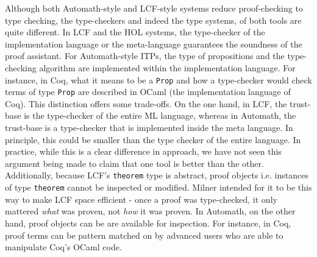 \documentclass{article}
\begin{document}
  	Although both Automath-style and 
  	LCF-style systems reduce proof-checking
  	to type checking, the type-checkers 
  	and indeed the type systems, 
  	of both tools are quite different.
  	In LCF and the HOL systems, the 
  	type-checker of the implementation 
  	language or the meta-language 
  	guarantees the soundness of the
  	proof assistant. For Automath-style
  	ITPs, the type of propositions and the 
  	type-checking algorithm are 
  	implemented within the 
  	implementation language. For 
  	instance, in Coq, what it means to 
  	be a \texttt{Prop} and how a 
  	type-checker would check 
  	terms of type \texttt{Prop} are 
  	described in OCaml (the 
  	implementation language of Coq). 
  	This distinction
  	offers some trade-offs. On the one 
  	hand, in LCF, the trust-base is 
  	the type-checker of the entire
  	ML language, whereas in Automath, 
  	the trust-base is a type-checker
  	that is implemented inside the 
  	meta language. In principle, this 
  	could be smaller than the type
  	checker of the entire language.
  	In practice, while this is a 
  	clear difference in approach,
  	we have not seen this argument 
  	being made to claim that one tool 
  	is better than the other. 
  	Additionally, because LCF's 
  	\texttt{theorem} type is abstract, 
  	proof objects i.e. instances of type
  	\texttt{theorem} cannot be 
  	inspected or modified. Milner
  	intended for it to be this way
  	to make LCF space efficient - 
  	once a proof was type-checked, 
  	it only mattered \textit{what}
  	was proven, not \textit{how} it 
  	was proven. In Automath, on the 
  	other hand, proof objects can be 
  	are available for inspection.
  	For instance, in Coq, proof terms 
  	can be pattern matched on by 
  	advanced users who are able to 
  	manipulate Coq's OCaml code.
  	
\end{document}
